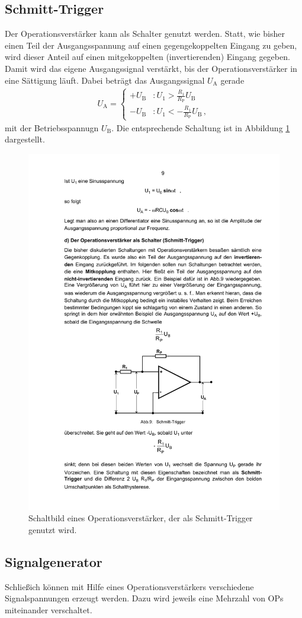 \subsection{Schmitt-Trigger}
\label{subsec:schmitt_trigger}
Der Operationsverstärker kann als Schalter genutzt werden. Statt, wie bisher
einen Teil der Ausgangsspannung auf einen gegengekoppelten Eingang zu geben,
wird dieser Anteil auf einen mitgekoppelten (invertierenden) Eingang gegeben.
Damit wird das eigene Ausgangssignal verstärkt, bis der Operationsverstärker
in eine Sättigung läuft.
Dabei beträgt das Ausgangssignal $U_\text{A}$ gerade
\begin{align*}
    U_\text{A} = 
    \begin{cases}
        +U_\text{B} &: U_1 > \frac{R_1}{R_\text{P}}U_\text{B} \\
        -U_\text{B} &: U_1 < -\frac{R_1}{R_\text{P}}U_\text{B}\,,
    \end{cases}
\end{align*}
mit der Betriebsspannugn $U_\text{B}$.
Die entsprechende Schaltung ist in Abbildung \ref{fig:schmitt_trigger}
dargestellt.
\begin{figure}
    \centering
    \includegraphics[width=0.5\linewidth]{img/schmitt_trigger.pdf}
    \caption{
        Schaltbild eines Operationsverstärker, der als Schmitt-Trigger
        genutzt wird.
    }
    \label{fig:schmitt_trigger}
\end{figure}

\subsection{Signalgenerator}
\label{subsec:signalgenerator}
Schließich können mit Hilfe eines Operationsverstärkers verschiedene
Signalspannungen erzeugt werden. Dazu wird jeweils eine Mehrzahl von OPs
miteinander verschaltet.

